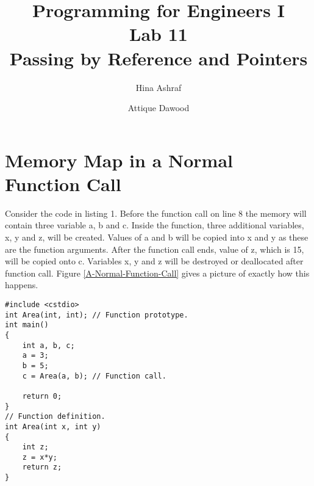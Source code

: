 \documentclass{article}
\title{Programming for Engineers I\\Lab 11\\Passing by Reference and Pointers}
\author{Hina Ashraf\and Attique Dawood}
\begin{document}
\maketitle
\section{Memory Map in a Normal Function Call}
Consider the code in listing 1. Before the function call on line 8 the memory will contain three variable a, b and c. Inside the function, three additional variables, x, y and z, will be created. Values of a and b will be copied into x and y as these are the function arguments. After the function call ends, value of z, which is 15, will be copied onto c. Variables x, y and z will be destroyed or deallocated after function call. Figure \ref{A-Normal-Function-Call} gives a picture of exactly how this happens.
\begin{lstlisting}[caption={Calling a function}]
#include <cstdio>
int Area(int, int); // Function prototype.
int main()
{
	int a, b, c;
	a = 3;
	b = 5;
	c = Area(a, b); // Function call.
	
	return 0;
}
// Function definition.
int Area(int x, int y)
{
	int z;
	z = x*y;
	return z;
}
\end{lstlisting}
\end{document}
